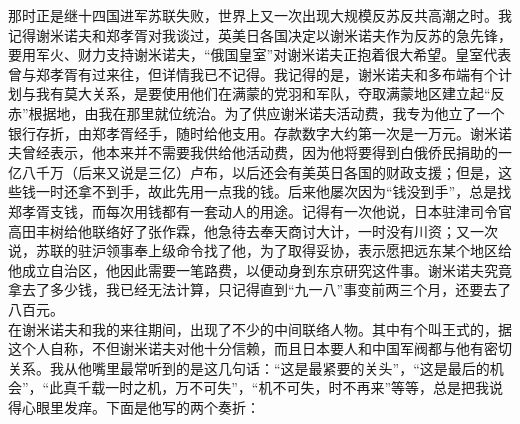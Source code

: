 那时正是继十四国进军苏联失败，世界上又一次出现大规模反苏反共高潮之时。我记得谢米诺夫和郑孝胥对我谈过，英美日各国决定以谢米诺夫作为反苏的急先锋，要用军火、财力支持谢米诺夫，“俄国皇室”对谢米诺夫正抱着很大希望。皇室代表曾与郑孝胥有过来往，但详情我已不记得。我记得的是，谢米诺夫和多布端有个计划与我有莫大关系，是要使用他们在满蒙的党羽和军队，夺取满蒙地区建立起“反赤”根据地，由我在那里就位统治。为了供应谢米诺夫活动费，我专为他立了一个银行存折，由郑孝胥经手，随时给他支用。存款数字大约第一次是一万元。谢米诺夫曾经表示，他本来并不需要我供给他活动费，因为他将要得到白俄侨民捐助的一亿八千万（后来又说是三亿）卢布，以后还会有美英日各国的财政支援；但是，这些钱一时还拿不到手，故此先用一点我的钱。后来他屡次因为“钱没到手”，总是找郑孝胥支钱，而每次用钱都有一套动人的用途。记得有一次他说，日本驻津司令官高田丰树给他联络好了张作霖，他急待去奉天商讨大计，一时没有川资；又一次说，苏联的驻沪领事奉上级命令找了他，为了取得妥协，表示愿把远东某个地区给他成立自治区，他因此需要一笔路费，以便动身到东京研究这件事。谢米诺夫究竟拿去了多少钱，我已经无法计算，只记得直到“九一八”事变前两三个月，还要去了八百元。\\

在谢米诺夫和我的来往期间，出现了不少的中间联络人物。其中有个叫王式的，据这个人自称，不但谢米诺夫对他十分信赖，而且日本要人和中国军阀都与他有密切关系。我从他嘴里最常听到的是这几句话：“这是最紧要的关头”，“这是最后的机会”，“此真千载一时之机，万不可失”，“机不可失，时不再来”等等，总是把我说得心眼里发痒。下面是他写的两个奏折：\\

